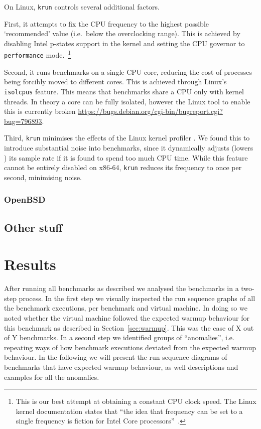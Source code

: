 \documentclass[10pt,preprint]{sigplanconf}
\newcommand{\krun}{\texttt{krun}\xspace}
\begin{document}
On Linux, \krun controls several additional factors.

First, it attempts to fix the CPU frequency to the highest
possible `recommended' value (i.e.~below the overclocking range). This is achieved by disabling Intel
p-states support in the kernel and setting the CPU governor to \texttt{performance}
mode.~\footnote{This is our best attempt at obtaining a constant CPU clock
speed. The Linux kernel documentation states that ``the idea that frequency can
be set to a single frequency is fiction for Intel Core
processors''~\cite{XXX}.}

Second, it runs benchmarks on a single CPU core, reducing the cost of processes
being forcibly moved to different cores. This is achieved through Linux's
\texttt{isolcpus} feature.  This means that benchmarks
share a CPU only with kernel threads. In theory a core can be fully isolated,
however the Linux tool to enable this is currently broken
\url{https://bugs.debian.org/cgi-bin/bugreport.cgi?bug=796893}.

Third, \krun minimises the effects of the Linux kernel profiler . We found this to introduce
substantial noise into benchmarks, since it dynamically adjusts (lowers
) its sample rate if it is found
to spend too much CPU time. While this feature cannot be entirely disabled on
x86-64, \krun reduces its frequency to once per second, minimising noise.


\subsubsection{OpenBSD}



\subsection{Other stuff}



\section{Results}
\label{sec:Results}

After running all benchmarks as described we analysed the benchmarks in a
two-step process. In the first step we visually inspected the run sequence
graphs of all the benchmark executions, per benchmark and virtual machine. In
doing so we noted whether the virtual machine followed the expected warmup
behaviour for this benchmark as described in Section~\ref{sec:warmup}. This was
the case of  X out of Y benchmarks. In a second step we
identified groups of ``anomalies'', i.e. repeating ways of how benchmark
executions deviated from the expected warmup behaviour. In the following we will
present the run-sequence diagrams of benchmarks that have expected warmup
behaviour, as well descriptions and examples for all the anomalies.
\end{document}
